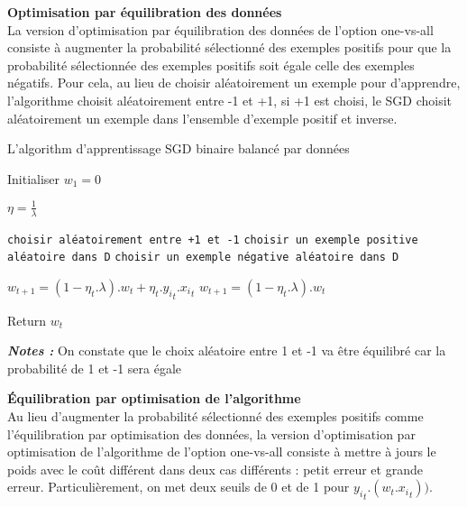 \textbf{Optimisation par équilibration des données}\\

La version d'optimisation par équilibration des données de l'option one-vs-all consiste à augmenter la probabilité sélectionné des exemples positifs pour que la probabilité sélectionnée des exemples positifs soit égale celle des exemples négatifs. Pour cela, au lieu de choisir aléatoirement un exemple pour d'apprendre, l'algorithme choisit aléatoirement entre -1 et +1, si +1 est choisi, le SGD choisit aléatoirement un exemple dans l'ensemble d'exemple positif et inverse.

\begin{algorithm}[H]
\caption{L'algorithm d'apprentissage SGD binaire balancé par données}\label{balance-sgdal}
\begin{algorithmic}[1]

\State Initialiser $w_1 = 0$


\State $\eta = \frac{1}{\lambda}$

\State \texttt{choisir aléatoirement entre +1 et -1}
\State \texttt{choisir un exemple positive aléatoire dans D}
\Else
\State \texttt{choisir un exemple négative aléatoire dans D}
\EndIf

\State $w_{t+1} = (1 - \eta_t.\lambda).w_t + \eta_t.{y_i}_t.{x_i}_t$
\Else
\State $w_{t+1} = (1 - \eta_t.\lambda).w_t$
\EndIf
\EndFor

\EndFor

\State Return $w_{t}$

\EndProcedure
\end{algorithmic}
\end{algorithm}

\emph{\textbf{Notes :}} On constate que le choix aléatoire entre 1 et -1 va être équilibré car la probabilité de 1 et -1 sera égale

\textbf{Équilibration par optimisation de l'algorithme}\\

Au lieu d'augmenter la probabilité sélectionné des exemples positifs comme l'équilibration par optimisation des données, la version d'optimisation par optimisation de l'algorithme de l'option one-vs-all consiste à mettre à jours le poids avec le coût différent dans deux cas différents : petit erreur et grande erreur. Particulièrement, on met deux seuils de 0 et de 1 pour ${y_i}_t.(w_t.{x_i}_t))$.

